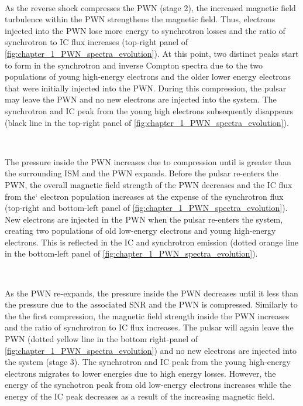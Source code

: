 \par~\par
As the reverse shock compresses the PWN (stage 2), the increased magnetic field turbulence within the PWN strengthens the magnetic field. Thus, electrons injected into the PWN lose more energy to synchrotron losses and the ratio of synchrotron to IC flux increases (top-right panel of \autoref{fig:chapter_1_PWN_spectra_evolution}). At this point, two distinct peaks start to form in the synchrotron and inverse Compton spectra due to the two populations of young high-energy electrons and the older lower energy electrons that were initially injected into the PWN. During this compression, the pulsar may leave the PWN and no new electrons are injected into the system. The synchrotron and IC peak from the young high electrons subsequently disappears (black line in the top-right panel of \autoref{fig:chapter_1_PWN_spectra_evolution}).
\par~\par
The pressure inside the PWN increases due to compression until is greater than the surrounding ISM and the PWN expands. Before the pulsar re-enters the PWN, the overall magnetic field strength of the PWN decreases and the IC flux from the`  electron population increases at the expense of the synchrotron flux (top-right and bottom-left panel of \autoref{fig:chapter_1_PWN_spectra_evolution}). New electrons are injected in the PWN when the pulsar re-enters the system, creating two populations of old low-energy electrons and young high-energy electrons. This is reflected in the IC and synchrotron emission (dotted orange line in the bottom-left panel of \autoref{fig:chapter_1_PWN_spectra_evolution}).
\par~\par
As the PWN re-expands, the pressure inside the PWN decreases until it less than the pressure due to the associated SNR and the PWN is compressed. Similarly to the the first compression, the magnetic field strength inside the PWN increases and the ratio of synchrotron to IC flux increases. The pulsar will again leave the PWN (dotted yellow line in the bottom right-panel of \autoref{fig:chapter_1_PWN_spectra_evolution}) and no new electrons are injected into the system (stage 3). The synchrotron and IC peak from the young high-energy electrons migrates to lower energies due to high energy losses. However, the energy of the synchotron peak from old low-energy electrons increases while the energy of the IC peak decreases as a result of the increasing magnetic field.

